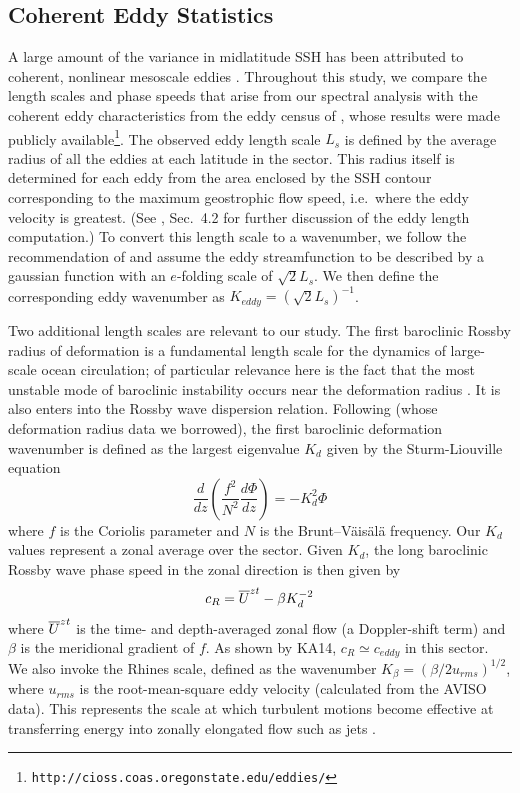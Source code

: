 \documentclass[10pt]{article}
\newcommand{\od}[2]{\ensuremath{\frac{d #1}{d #2}}}
\newcommand{\ol}{\ensuremath{\overline}}
\begin{document}
\subsection{Coherent Eddy Statistics}

A large amount of the variance in midlatitude SSH has been attributed to coherent, nonlinear mesoscale eddies \citep{CheltonEtAl2011}. Throughout this study, we compare the length scales and phase speeds that arise from our spectral analysis with the coherent eddy characteristics from the eddy census of \citet{CheltonEtAl2011}, whose results were made publicly available\footnote{{\tt http://cioss.coas.oregonstate.edu/eddies/}}. The observed eddy length scale $L_s$ is defined by the average radius of all the eddies at each latitude in the sector. This radius itself is determined for each eddy from the area enclosed by the SSH contour corresponding to the maximum geostrophic flow speed, i.e.~where the eddy velocity is greatest. (See \citealt{CheltonEtAl2011}, Sec.~4.2 for further discussion of the eddy length computation.) To convert this length scale to a wavenumber, we follow the recommendation of \citet{CheltonEtAl2011} and assume the eddy streamfunction to be described by a gaussian function with an $e$-folding scale of $\sqrt{2} L_s$. We then define the corresponding eddy wavenumber as $K_{eddy} = (\sqrt{2} L_s)^{-1}$.

Two additional length scales are relevant to our study. The first baroclinic Rossby radius of deformation is a fundamental length scale for the dynamics of large-scale ocean circulation; of particular relevance here is the fact that the most unstable mode of baroclinic instability occurs near the deformation radius \citep{CheltonEtAl1998,Stammer1997,Smith2007}. It is also enters into the Rossby wave dispersion relation. Following \citet{TullochEtAl2009} (whose deformation radius data we borrowed), the first baroclinic deformation wavenumber is defined as the largest eigenvalue $K_d$ given by the Sturm-Liouville equation
\begin{equation}
\od{}{z}\left (\frac{f^2}{N^2} \od{\Phi}{z} \right ) = - K_d^2 \Phi
\end{equation}
where $f$ is the Coriolis parameter and $N$ is the Brunt--V{\"a}is{\"a}l{\"a} frequency. Our $K_d$ values represent a zonal average over the sector. Given $K_d$, the long baroclinic Rossby wave phase speed in the zonal direction is then given by
\begin{equation}
c_R = \ol{U}^{zt}  - \beta K_d^{-2}
\label{eq:c_R}
\end{equation}
where $\ol{U}^{zt}$ is the time- and depth-averaged zonal flow (a Doppler-shift term) and $\beta$ is the meridional gradient of $f$. As shown by KA14, $c_R \simeq c_{eddy}$ in this sector. We also invoke the Rhines scale, defined as the wavenumber $K_\beta = (\beta / 2 u_{rms} )^{1/2}$, where $u_{rms}$ is the root-mean-square eddy velocity (calculated from the AVISO data). This represents the scale at which turbulent motions become effective at transferring energy into zonally elongated flow such as jets \citep{Rhines1975,VallisMaltrud1993}.
\end{document}
